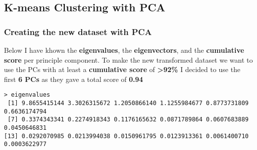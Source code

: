 \documentclass[11pt]{article}
\begin{document}
\subsection{K-means Clustering with PCA}
\subsubsection{Creating the new dataset with PCA}
Below I have khown the \textbf{eigenvalues}, the \textbf{eigenvectors}, and the \textbf{cumulative score} per principle component. 
To make the new transformed dataset we want to use the PCs with at least a \textbf{cumulative score} of \textbf{\textgreater 92\%}
I decided to use the first \textbf{6 PCs} as they gave a total score of \textbf{0.94}
\begin{lstlisting}
> eigenvalues
 [1] 9.8655415144 3.3026315672 1.2050866140 1.1255984677 0.8773731809 0.6636174794
 [7] 0.3374343341 0.2274918343 0.1176165632 0.0871789864 0.0607683889 0.0450646831
[13] 0.0292070985 0.0213994038 0.0150961795 0.0123913361 0.0061400710 0.0003622977


\end{lstlisting}
\end{document}
